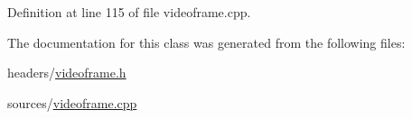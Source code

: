 Definition at line 115 of file videoframe.\+cpp.



The documentation for this class was generated from the following files\+:\begin{DoxyCompactItemize}
\item 
headers/\hyperlink{videoframe_8h}{videoframe.\+h}\item 
sources/\hyperlink{videoframe_8cpp}{videoframe.\+cpp}\end{DoxyCompactItemize}
